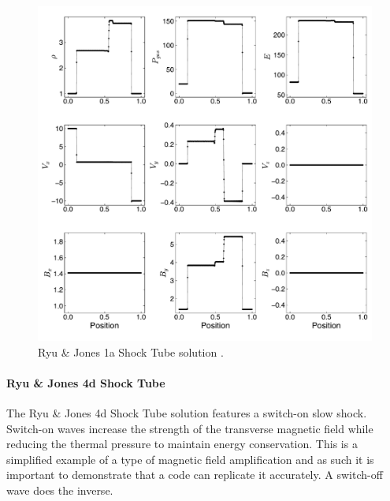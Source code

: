 \begin{figure}[ht!]
    \includegraphics[width=\linewidth]{assets/3-mhd-tests/rj1a.pdf}
    \caption{Ryu \& Jones 1a Shock Tube solution \citep{ryu_jones_1995}.
    }
    \label{fig:rj-1a}
\end{figure}

\paragraph{Ryu \& Jones 4d Shock Tube}

The Ryu \& Jones 4d Shock Tube solution \citep{ryu_jones_1995} features a switch-on slow shock. Switch-on waves increase the strength of the transverse magnetic field while reducing the thermal pressure to maintain energy conservation. This is a simplified example of a type of magnetic field amplification and as such it is important to demonstrate that a code can replicate it accurately. A switch-off wave does the inverse.

